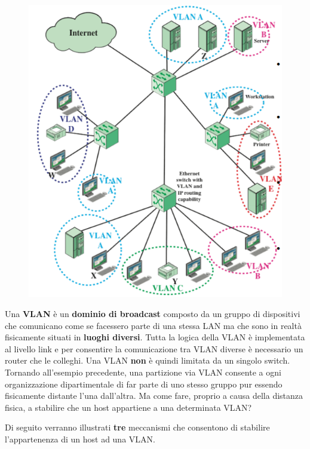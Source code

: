 \documentclass[11pt,a4paper,oneside]{book}
\theoremstyle{definition}
\begin{document}
\begin{figure}
	\includegraphics[scale=0.35]{Immagini/Vlan2.png}
	\centering
\end{figure}
 
Una \textbf{VLAN} è un \textbf{dominio di broadcast} composto da un gruppo di dispositivi che comunicano come se facessero parte di una stessa LAN ma che sono in realtà fisicamente situati in \textbf{luoghi diversi}. Tutta la logica della VLAN è implementata al livello link e per consentire la comunicazione tra VLAN diverse è necessario un router che le colleghi. Una VLAN \textbf{non} è quindi limitata da un singolo switch. Tornando all'esempio precedente, una partizione via VLAN consente a ogni organizzazione dipartimentale di far parte di uno stesso gruppo pur essendo fisicamente distante l'una dall'altra. Ma come fare, proprio a causa della distanza fisica, a stabilire che un host appartiene a una determinata VLAN? 

Di seguito verranno illustrati \textbf{tre} meccanismi che consentono di stabilire l'appartenenza di un host ad una VLAN.
\end{document}
